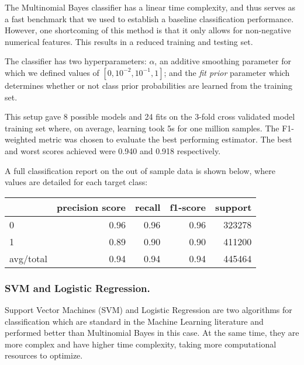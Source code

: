 The Multinomial Bayes classifier has a linear time complexity, and thus serves as a fast benchmark that we used to establish a baseline classification performance. However, one shortcoming of this method is that it only allows for non-negative numerical features. This results in a reduced training and testing set.

The classifier has two hyperparameters: $\alpha$, an additive smoothing parameter for which we defined values of $[0,{10^{-2}},{10^{-1}},1]$; and the \textit{fit prior} parameter which determines whether or not class prior probabilities are learned from the training set. 

This setup gave 8 possible models and 24 fits on the 3-fold cross validated model training set where, on average, learning took 5s for one million samples. The F1-weighted metric was chosen to evaluate the best performing estimator.
The best and worst scores achieved were 0.940 and 0.918 respectively. 

A full classification report on the out of sample data is shown below, where values are detailed for each target class:
\begin{table}[ht]
	\label{tab:classification_report}
	\centering
	\begin{tabular}{ l r r r r }
		\toprule
		{ } & precision score & recall  & f1-score & support \\
		\midrule
		0 		  & 0.96 & 0.96  & 0.96 & 323278  \\
		1		  & 0.89 &  0.90 &  0.90 & 411200 \\
		avg/total & 0.94 &  0.94 &  0.94 & 445464 \\
		\bottomrule
	\end{tabular}
\end{table}


\subsubsection{SVM and Logistic Regression.}

Support Vector Machines (SVM) and Logistic Regression are two algorithms for classification which are standard in the Machine Learning literature and performed better than Multinomial Bayes in this case. 
At the same time, they are more complex and have higher time complexity, taking more computational resources to optimize.

